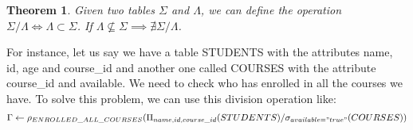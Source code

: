 \documentclass[12pt]{article}
\newtheorem{theorem}{Theorem}
\begin{document}
\begin{theorem}
    Given two tables \(\Sigma\) and \(\Lambda\), we can define the operation \(\Sigma/\Lambda\iff\Lambda \subset \Sigma\). If \(\Lambda \nsubseteq \Sigma \implies \nexists\Sigma/\Lambda \).
\end{theorem}

For instance, let us say we have a table STUDENTS with the attributes name, id, age and course\_id and another one called COURSES with the attribute course\_id and available. We need to check who has enrolled in all the courses we have. To solve this problem, we can use this division operation like:
\[
    \Gamma \leftarrow \rho_{ENROLLED\_ALL\_COURSES}(\Pi_{name,id,course\_id}(STUDENTS) /\sigma_{available="true"}(COURSES))
\]
\end{document}
